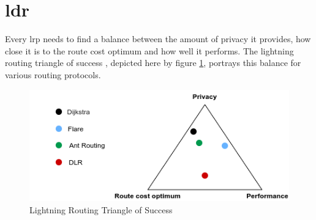 \section{\acrshort{ldr}}

Every \acrshort{lrp} needs to find a balance between the amount of privacy it provides, how close it is to the route cost optimum and how well it performs. The lightning routing triangle of success \cite{trampoline_routing_slides}, depicted here by figure \ref{fig:triangle}, portrays this balance for various routing protocols.

\begin{figure}[H]
\begin{center}
   \includegraphics[width=0.9\linewidth]{images/triangle_paper.png}
  \caption{Lightning Routing Triangle of Success}
  \label{fig:triangle}
  \end{center}
\end{figure}

